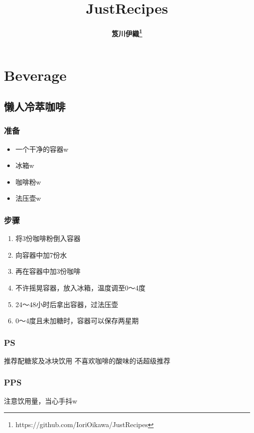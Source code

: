 \documentclass[12pt, a4paper]{ctexart}
\begin{document}
\title{JustRecipes}
\author{\bfseries 笈川伊織\footnote{https://github.com/IoriOikawa/JustRecipes}}
\date{}

\maketitle
\setcounter{secnumdepth}{2}
\tableofcontents

\newpage
\section{Beverage}

\subsection{懒人冷萃咖啡}
\subsubsection{准备}
\begin{itemize}
    \item{一个干净的容器w}
    \item{冰箱w}
    \item{咖啡粉w}
    \item{法压壶w}
\end{itemize}

\subsubsection{步骤}
\begin{enumerate}[start=0]
    \item{将3份咖啡粉倒入容器}
    \item{向容器中加7份水}
    \item{再在容器中加3份咖啡}
    \item{不许摇晃容器，放入冰箱，温度调至0～4度}
    \item{24～48小时后拿出容器，过法压壶}
    \item{0～4度且未加糖时，容器可以保存两星期}
\end{enumerate}

\subsubsection{PS}
推荐配糖浆及冰块饮用 不喜欢咖啡的酸味的话超级推荐

\subsubsection{PPS}
注意饮用量，当心手抖w
\end{document}
